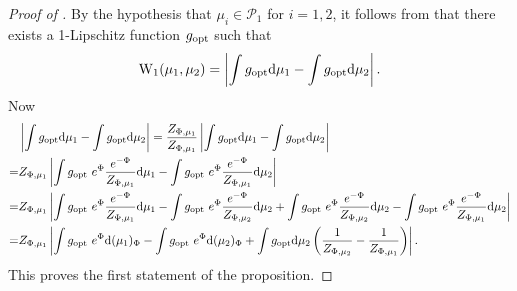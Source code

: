 \documentclass[a4paper]{scrartcl}
\theoremstyle{definition}
\numberwithin{equation}{section}
\newcommand{\rd}{\mathrm{d}}
\newcommand{\Abs}[1]{\left\vert#1\right\vert}
\newcommand{\Was}[0]{\textup{W}}
\newcommand{\opt}[0]{\textup{opt}}
\begin{document}
\WassersteinLowerboundPriorperturbations*
\begin{proof}[Proof of ]
 By the hypothesis that $\mu_i\in\mathcal{P}_1$ for $i=1,2$, it follows from  that there exists a 1-Lipschitz function $g_\opt$ such that 
 \begin{equation*}
    \Was_1(\mu_1,\mu_2)=\Abs{\int g_\opt \rd \mu_1-\int g_\opt \rd \mu_2}.
 \end{equation*}
Now
 \begin{align*}
 &\Abs{\int g_\opt \rd \mu_1-\int g_\opt \rd \mu_2}=\frac{Z_{\Phi,\mu_1}}{Z_{\Phi,\mu_1}}\Abs{\int g_\opt \rd \mu_1-\int g_\opt \rd \mu_2}
  \\
  =& Z_{\Phi,\mu_1} \Abs{\int g_\opt ~e^\Phi \frac{e^{-\Phi}}{Z_{\Phi,\mu_1}}\rd \mu_1-\int g_\opt ~e^{\Phi}\frac{e^{-\Phi}}{Z_{\Phi,\mu_1}}\rd \mu_2 }
  \\
  =& Z_{\Phi,\mu_1} \Abs{\int g_\opt ~e^\Phi \frac{e^{-\Phi}}{Z_{\Phi,\mu_1}}\rd \mu_1-\int g_\opt ~e^\Phi \frac{e^{-\Phi}}{Z_{\Phi,\mu_2}}\rd\mu_2+\int g_\opt ~e^\Phi \frac{e^{-\Phi}}{Z_{\Phi,\mu_2}}\rd\mu_2 -\int g_\opt~ e^{\Phi}\frac{e^{-\Phi}}{Z_{\Phi,\mu_1}}\rd \mu_2 }
  \\
  =& Z_{\Phi,\mu_1} \Abs{\int g_\opt ~e^\Phi \rd (\mu_1)_\Phi-\int g_\opt ~ e^\Phi \rd (\mu_2)_\Phi+\int g_\opt \rd \mu_2\left(\frac{1}{Z_{\Phi,\mu_2}}-\frac{1}{Z_{\Phi,\mu_1}}\right)}.
 \end{align*}
 This proves the first statement of the proposition.


\end{proof}
\end{document}
